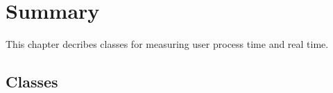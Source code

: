 
\ccParDims

\clearpage
{}

\section*{Summary}

This chapter decribes classes for measuring user process time and real time.

\subsection*{Classes}
\\
\\
